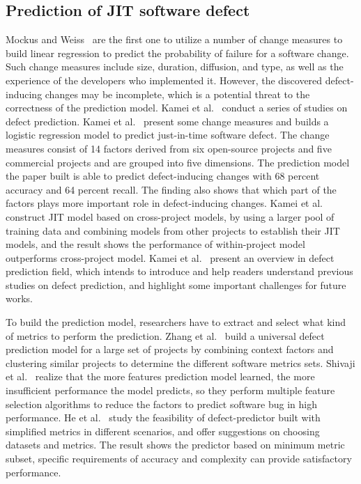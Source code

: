 \subsection{Prediction of JIT software defect}
Mockus and Weiss~\cite{mockus2000predicting} are the first one to utilize a number of change measures to build linear regression to predict the probability of failure for a software change. Such change measures include size, duration, diffusion, and type, as well as the experience of the developers who implemented it. However, the discovered defect-inducing changes may be incomplete, which is a potential threat to the correctness of the prediction model. Kamei et al.~\cite{Kamei2013TSE,kamei2016studying,kamei2016defect} conduct a series of studies on defect prediction. Kamei et al.~\cite{Kamei2013TSE} present some change measures and builds a logistic regression model to predict just-in-time software defect. The change measures consist of 14 factors derived from six open-source projects and five commercial projects and are grouped into five dimensions. The prediction model the paper built is able to predict defect-inducing changes with 68 percent accuracy and 64 percent recall. The finding also shows that which part of the factors plays more important role in defect-inducing changes. Kamei et al.~\cite{kamei2016studying} construct JIT model based on cross-project models, by using a larger pool of training data and combining models from other projects to establish their JIT models, and the result shows the performance of within-project model outperforms cross-project model. Kamei et al.~\cite{kamei2016defect} present an overview in defect prediction field, which intends to introduce and help readers understand previous studies on defect prediction, and highlight some important challenges for future works.

To build the prediction model, researchers have to extract and select what kind of metrics to perform the prediction. Zhang et al.~\cite{Zhang:2014:TBU} build a universal defect prediction model for a large set of projects by combining context factors and clustering similar projects to determine the different software metrics sets. Shivaji et al.~\cite{Shivaji2013TSE} realize that the more features prediction model learned, the more insufficient performance the model predicts, so they perform multiple feature selection algorithms to reduce the factors to predict software bug in high performance. He et al.~\cite{he2015empirical} study the feasibility of defect-predictor built with simplified metrics in different scenarios, and offer suggestions on choosing datasets and metrics. The result shows the predictor based on minimum metric subset, specific requirements of accuracy and complexity can provide satisfactory performance.

